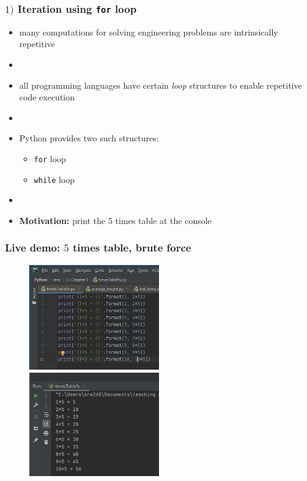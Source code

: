 \documentclass[english,14pt]{beamer}
\newcommand\red[1]{{\color{red} #1}}
\begin{document}
\begin{frame}[fragile]

\frametitle{$1)$ Iteration using \texttt{for} loop}

\begin{itemize}
	\item many computations for solving engineering problems are intrinsically repetitive
	\item[]
	\item all programming languages have certain \red{\emph{loop}} structures to enable repetitive code execution
	\item[]
	\item Python provides two such structures:
	\begin{itemize}
		\item \texttt{for} loop
		\item \texttt{while} loop
	\end{itemize}
	\item[]
	\vspace*{-3mm}
	\item \textbf{Motivation:} print the 5 times table at the console
\end{itemize}

\end{frame}

\begin{frame}[fragile]

\frametitle{}

\frametitle{Live demo: $5$ times table, brute force}

\begin{figure}[ht]
	\centering
	\includegraphics[width=0.5\textwidth]{figures/LLp59aoutput}%
	~~\includegraphics[width=0.5\textwidth]{figures/LLp59boutput}
\end{figure}


\end{frame}
\end{document}

